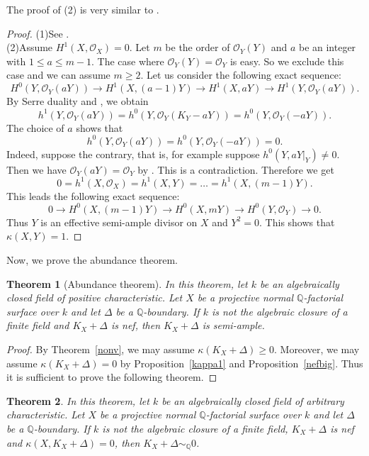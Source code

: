 \documentclass[12pt,twoside]{amsart}
\newtheorem{thm}{Theorem}[section]
\theoremstyle{definition}
\newcommand{\Q}{$\mathbb{Q}$}
\begin{document}
The proof of (2) is very similar to \cite[Theorem~2.1]{Totaro}.

\begin{proof}
(1)See \cite[Lemma in P.682]{Masek}. \\
(2)Assume $H^1(X, \mathcal O_X)=0$. 
Let $m$ be the order of $\mathcal{O}_Y(Y)$ and 
$a$ be an integer with $1 \leq a \leq m-1$. 
The case where $\mathcal{O}_Y(Y)=\mathcal{O}_Y$ is easy. 
So we exclude this case and we can assume $m \geq 2$. 
Let us consider the following exact sequence: 
\[H^0(Y, \mathcal{O}_Y(aY)) \to H^1(X, (a-1)Y) \to H^1(X, aY) 
\to H^1(Y, \mathcal{O}_Y(aY)).\] 
By Serre duality and \cite[Corollary 1 in P.333]{Mum}, we obtain 
$$h^1(Y, \mathcal{O}_Y(aY))=h^0(Y, \mathcal{O}_Y(K_Y-aY))=
h^0(Y, \mathcal{O}_Y(-aY)). $$ 
The choice of $a$ shows that 
$$h^0(Y, \mathcal{O}_Y(aY))=h^0(Y, \mathcal{O}_Y(-aY))=0. $$
Indeed, suppose the contrary, that is, 
for example suppose $h^0(Y, aY|_Y) \neq 0$. 
Then we have $\mathcal{O}_Y(aY)=\mathcal{O}_Y$ 
by \cite[Lemma on P.332]{Mum}. This is a contradiction. 
Therefore we get 
\[0=h^1(X, \mathcal{O}_X)=h^1(X, Y)= \dots =h^1(X, (m-1)Y).\] 
This leads the following exact sequence: 
\[0 \to H^0(X, (m-1)Y) \to H^0(X, mY) \to H^0(Y, \mathcal{O}_Y) \to 0.\]
Thus $Y$ is an effective semi-ample divisor on $X$ and $Y^2=0$. 
This shows that $\kappa(X, Y)=1$.
\end{proof}


Now, we prove the abundance theorem. 


\begin{thm}[Abundance theorem]\label{qabundance}
In this theorem, let $k$ be an algebraically closed field of positive characteristic. 
Let $X$ be a projective normal \Q-factorial surface over $k$ and 
let $\Delta$ be a \Q-boundary. 
If $k$ is not the algebraic closure of a finite field and 
$K_X+\Delta$ is nef, then $K_X+\Delta$ is semi-ample. 
\end{thm}


\begin{proof}
By Theorem~\ref{nonv}, we may assume $\kappa(K_X+\Delta)\geq 0$. 
Moreover, we may assume $\kappa(K_X+\Delta)=0$ 
by Proposition~\ref{kappa1} and Proposition~\ref{nefbig}. 
Thus it is sufficient to prove the following theorem. 
\end{proof}


\begin{thm}\label{qabundancekappazero}
In this theorem, 
let $k$ be an algebraically closed field of arbitrary characteristic. 
Let $X$ be a projective normal \Q-factorial surface over $k$ and 
let $\Delta$ be a \Q-boundary. 
If $k$ is not the algebraic closure of a finite field, 
$K_X+\Delta$ is nef and 
$\kappa(X, K_X+\Delta)=0$, 
then $K_X+\Delta\sim_{\mathbb{Q}}0$. 
\end{thm}
\end{document}
